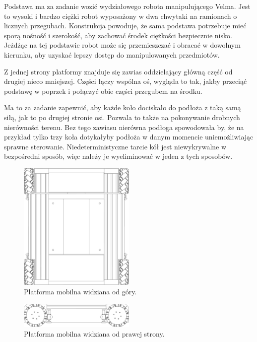 Podstawa ma za zadanie wozić wydziałowego robota manipulującego Velma.
Jest to wysoki i bardzo ciężki robot wyposażony w dwa chwytaki na ramionach o licznych przegubach.
Konstrukcja powoduje, że sama podstawa potrzebuje mieć sporą nośność i szerokość, aby zachować środek ciężkości bezpiecznie nisko.
Jeżdżąc na tej podstawie robot może się przemieszczać i obracać w dowolnym kierunku, aby uzyskać lepszy dostęp do manipulowanych przedmiotów.

Z jednej strony platformy znajduje się zawias oddzielający główną część od drugiej nieco mniejszej.
Części łączy wspólna oś, wygląda to tak, jakby przeciąć podstawę w poprzek i połączyć obie części przegubem na środku.

Ma to za zadanie zapewnić, aby każde koło dociskało do podłoża z taką samą siłą, jak to po drugiej stronie osi.
Pozwala to także na pokonywanie drobnych nierówności terenu.
Bez tego zawiasu nierówna podłoga spowodowała by, że na przykład tylko trzy koła dotykałyby podłoża w danym momencie uniemożliwiając sprawne sterowanie.
Niedeterministyczne tarcie kół jest niewykrywalne w bezpośredni sposób, więc należy je wyeliminować w jeden z tych sposobów.

\begin{figure}
\centering
 \includegraphics[width=0.5\textwidth]{graphics/base_top.pdf}
\caption{Platforma mobilna widziana od góry.}
\end{figure} 

\begin{figure}
\centering
 \includegraphics[width=0.5\textwidth]{graphics/base_side.pdf}
\caption{Platforma mobilna widziana od prawej strony.}
\end{figure} 

